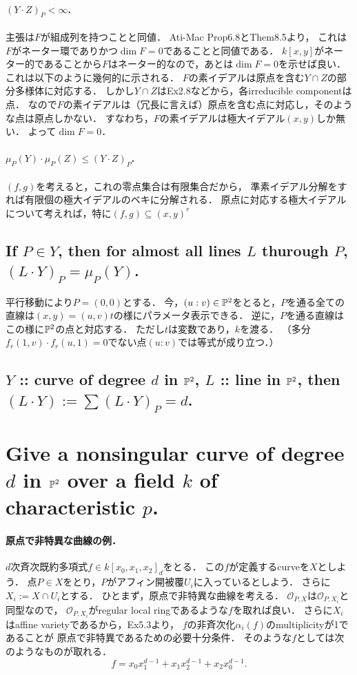 \documentclass[a4paper]{jsarticle}
\begin{document}
    \paragraph{$(Y \cdot Z)_P < \infty$.}
    主張は$F$が組成列を持つことと同値．
    Ati-Mac Prop6.8とThem8.5より，
    これは$F$がネーター環でありかつ$\dim F=0$であることと同値である．
    $k[x,y]$がネーター的であることから$F$はネーター的なので，あとは$\dim F=0$を示せば良い．
    これは以下のように幾何的に示される．
    $F$の素イデアルは原点を含む$Y \cap Z$の部分多様体に対応する．
    しかし$Y \cap Z$はEx2.8などから，各irreducible componentは点．
    なので$F$の素イデアルは（冗長に言えば）原点を含む点に対応し，そのような点は原点しかない．
    すなわち，$F$の素イデアルは極大イデアル$(x,y)$しか無い．
    よって$\dim F=0$．

    \paragraph{$\mu_P(Y) \cdot \mu_P(Z) \leq (Y \cdot Z)_P$.}
    $(f,g)$を考えると，これの零点集合は有限集合だから，
    準素イデアル分解をすれば有限個の極大イデアルのベキに分解される．
    原点に対応する極大イデアルについて考えれば，特に$(f,g) \subseteq (x,y)^r$

    \subsection{If $P \in Y$, then for almost all lines $L$ thurough $P$, $(L \cdot Y)_P=\mu_P(Y)$.}
    平行移動により$P=(0,0)$とする．
    今，$(u:v) \in \mathbb{P}^2$をとると，$P$を通る全ての直線は$(x,y)=(u,v)t$の様にパラメータ表示できる．
    逆に，$P$を通る直線はこの様に$\mathbb{P}^2$の点と対応する．
    ただし$t$は変数であり，$k$を渡る．
    （多分$f_r(1,v) \cdot f_r(u,1)=0$でない点$(u:v)$では等式が成り立つ．）

    \subsection{$Y$ :: curve of degree $d$ in $\mathbb{P}^2$, $L$ :: line in $\mathbb{P}^2$, then $(L \cdot Y):=\sum (L \cdot Y)_P=d$.}

\section{Give a nonsingular curve of degree $d$ in $\mathbb{P}^2$ over a field $k$ of characteristic $p$.} %
    \paragraph{原点で非特異な曲線の例．}
    $d$次斉次既約多項式$f \in k[x_0, x_1, x_2]_d$をとる．
    この$f$が定義するcurveを$X$としよう．
    点$P \in X$をとり，$P$がアフィン開被覆$U_i$に入っているとしよう．
    さらに$X_i:=X \cap U_i$とする．
    ひとまず，原点で非特異な曲線を考える．
    $\mathcal{O}_{P,X}$は$\mathcal{O}_{P,X_i}$と同型なので，
    $\mathcal{O}_{P,X_i}$がregular local ringであるような$f$を取れば良い．
    さらに$X_i$はaffine varietyであるから，Ex5.3より，
    $f$の非斉次化$\alpha_i(f)$のmultiplicityが1であることが
    原点で非特異であるための必要十分条件．
    そのような$f$としては次のようなものが取れる．
    \[ f=x_0 x_1^{d-1}+x_1 x_2^{d-1}+x_2 x_0^{d-1}. \]
\end{document}
